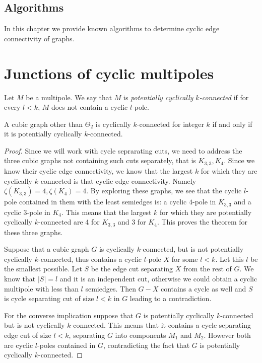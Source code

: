 \documentclass[12pt, twoside]{book}
\begin{document}
\section{Algorithms}\label{sec:algorithms}

In this chapter we provide known algorithms to determine cyclic edge connectivity of graphs.

\chapter{Junctions of cyclic multipoles}

\begin{definition}
	Let $M$ be a multipole. We say that $M$ is \textit{potentially cyclically $k$-connected} if for every $l < k$, $M$ does not contain a cyclic $l$-pole.
\end{definition}

\begin{lemma}\label{lem:graphs-potential-and-normal-cyclic-connected-eq}
	A cubic graph other than $\Theta_2$ is cyclically $k$-connected for integer $k$ if and only if it is potentially cyclically $k$-connected.
\end{lemma}

\begin{proof}
	Since we will work with cycle seprarating cuts, we need to address the three cubic graphs not containing such cuts separately, that is $K_{3,3}, K_4$. Since we know their cyclic edge connectivity, we know that the largest $k$ for which they are cyclically $k$-connected is that cyclic edge connectivity. Namely $\zeta(K_{3,3})=4, \zeta(K_4)=4$. By exploring these graphs, we see that the cyclic $l$-pole contained in them with the least semiedges is: a cyclic $4$-pole in $K_{3,3}$ and a cyclic $3$-pole in $K_4$. This means that the largest $k$ for which they are potentially cyclically $k$-connected are 4 for $K_{3,3}$ and 3 for $K_4$. This proves the theorem for these three graphs.
	
	Suppose that a cubic graph $G$ is cyclically $k$-connected, but is not potentially cyclically $k$-connected, thus contains a cyclic $l$-pole $X$ for some $l<k$. Let this $l$ be the smallest possible. Let $S$ be the edge cut separating $X$ from the rest of $G$. We know that $|S|=l$ and it is an independent cut, otherwise we could obtain a cyclic multipole with less than $l$ semiedges. Then $G-X$ contains a cycle as well and $S$ is cycle separating cut of size $l<k$ in $G$ leading to a contradiction.
	
	For the converse implication suppose that $G$ is potentially cyclically $k$-connected but is not cyclically $k$-connected. This means that it contains a cycle separating edge cut of size $l<k$, separating $G$ into components $M_1$ and $M_2$. However both are cyclic $l$-poles contained in $G$, contradicting the fact that $G$ is potentially cyclically $k$-connected.
\end{proof}
\end{document}
